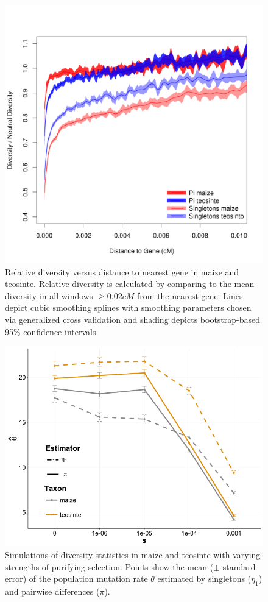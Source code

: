 \documentclass[12pt,a4paper]{article}
\begin{document}
\begin{figure}
  \includegraphics[width=\textwidth]{FigsAndFiles/distanceToGene_WithSignificance_Folded2_maizeAndTeoSingleVsPi.png}
\caption{ Relative diversity versus distance to nearest gene in maize and teosinte. Relative diversity is calculated by comparing to the mean diversity in all windows $\geq 0.02 cM$ from the nearest gene. Lines depict cubic smoothing splines with smoothing parameters chosen via generalized cross validation and shading depicts bootstrap-based 95\% confidence intervals.  \label{sFig:singletonPi}}
\end{figure}
\clearpage

\begin{figure}
  \includegraphics[width=\textwidth]{FigsAndFiles/jri_sims.png}
\caption{Simulations of diversity statistics in maize and teosinte with varying strengths of purifying selection. Points show the mean ($\pm$ standard error) of the population mutation rate $\theta$ estimated by singletons ($\eta_1$) and pairwise differences ($\pi$). \label{sFig:sims}}
\end{figure}
\clearpage
\end{document}
